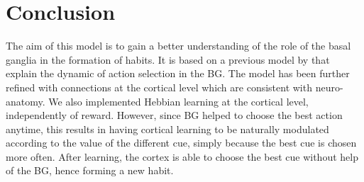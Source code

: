 \section{Conclusion}

The aim of this model is to gain a better understanding of the role of the
basal ganglia in the formation of habits. It is based on a previous model by
\citet{Guthrie2013} that explain the dynamic of action selection in the BG.
The model has been further refined with connections at the cortical level which
are consistent with neuro-anatomy. We also implemented Hebbian learning at the
cortical level, independently of reward. However, since BG helped to choose the
best action anytime, this results in having cortical learning to be naturally
modulated according to the value of the different cue, simply because the best
cue is chosen more often. After learning, the cortex is able to choose the best
cue without help of the BG, hence forming a new habit.


